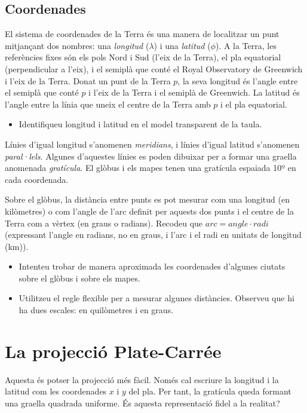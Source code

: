 \documentclass[a4paper,12pt]{article}
\begin{document}
\subsection*{Coordenades}
El sistema de coordenades de la Terra és una manera de localitzar un punt mitjançant dos nombres: una \emph{longitud} ($\lambda$) i una \emph{latitud} ($\phi$). A la Terra, les referències fixes són els pols Nord i Sud (l'eix de la Terra), el pla equatorial (perpendicular a l'eix), i el semiplà que conté el Royal Observatory de Greenwich i l'eix de la Terra. Donat un punt de la Terra $p$, la seva longitud és l'angle entre el semiplà que conté $p$ i l'eix de la Terra i el semiplà de Greenwich. La latitud és l'angle entre la línia que uneix el centre de la Terra amb $p$ i el pla equatorial.

\begin{itemize}
 \item Identifiqueu longitud i latitud en el model transparent de la taula.
\end{itemize}
Línies d'igual longitud s'anomenen \emph{meridians}, i línies d'igual latitud s'anomenen \emph{paral·lels}. Algunes d'aquestes línies es poden dibuixar per a formar una graella anomenada \emph{gratícula}. El glòbus i els mapes tenen una gratícula espaiada 10º en cada coordenada.

Sobre el glòbus, la distància entre punts es pot mesurar com una longitud (en kilòmetres) o com l'angle de l'arc definit per aquests dos punts i el centre de la Terra com a vèrtex (en graus o radians). Recodeu que 
$ arc = angle \cdot radi $
(expressant l'angle en radians, no en graus, i l'arc i el radi en unitats de longitud (km)).

\begin{itemize}
 \item Intenteu trobar de manera aproximada les coordenades d'algunes ciutats sobre el glòbus i sobre els mapes.
 \item Utilitzeu el regle flexible per a mesurar algunes distàncies. Observeu que hi ha dues escales: en quilòmetres i en graus.
\end{itemize}





\newpage
\section{La projecció Plate-Carrée}
Aquesta és potser la projecció més fàcil. Només cal escriure la longitud i la latitud com les coordenades $x$ i $y$ del pla. Per tant, la gratícula queda formant una graella quadrada uniforme. És aquesta representació fidel a la realitat?
\end{document}
